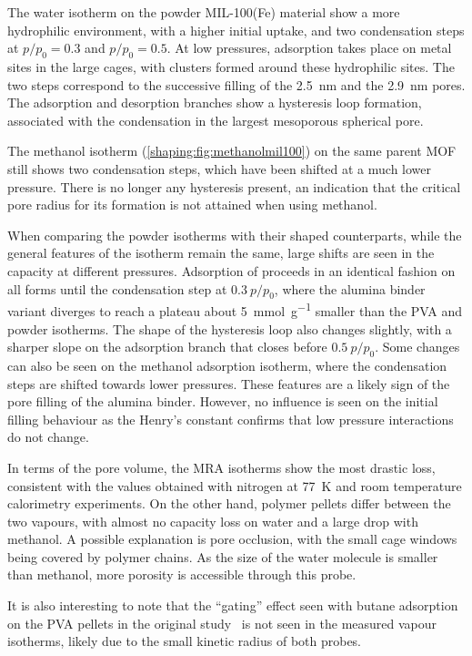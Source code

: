 The water isotherm on the powder MIL-100(Fe) material show a more 
hydrophilic environment, with a higher initial uptake, and two 
condensation steps at \(p/p_0 = 0.3\) and \(p/p_0 = 0.5\).
At low pressures, adsorption takes place on metal sites in the 
large cages, with clusters formed around these hydrophilic
sites. The two steps correspond to the successive filling of the 
\SI{2.5}{\nano\metre} and the \SI{2.9}{\nano\metre} pores. The
adsorption and desorption branches show a hysteresis loop 
formation, associated with the condensation in the largest 
mesoporous spherical pore.

The methanol isotherm (\autoref{shaping:fig:methanolmil100}) on 
the same parent \gls{MOF} still shows 
two condensation steps, which have been shifted at a much
lower pressure. There is no longer any hysteresis present,
an indication that the critical pore radius for its formation
is not attained when using methanol.

When comparing the powder isotherms with their shaped counterparts,
while the general features of the isotherm remain the same, 
large shifts are seen in the capacity at different pressures.
Adsorption of  proceeds in an identical fashion
on all forms until the condensation step at \(0.3~p/p_0\), where
the alumina binder variant diverges to reach a plateau about
\SI{5}{\milli\mol\per\gram} smaller than the \gls{PVA} and powder
isotherms. The shape of the hysteresis loop also changes slightly,
with a sharper slope on the adsorption branch that closes 
before \(0.5~p/p_0\). Some changes can also be seen on the methanol
adsorption isotherm, where the condensation steps are shifted 
towards lower pressures. These features are a likely sign of 
the pore filling of the alumina binder.
However, no influence is seen on the initial filling behaviour
as the Henry's constant confirms that low pressure 
interactions do not change. 

In terms of the pore volume, the \gls{MRA} isotherms 
show the most drastic loss, consistent with the values 
obtained with nitrogen at \SI{77}{\kelvin} and room temperature
calorimetry experiments. On the other hand, polymer pellets differ 
between the two vapours, with almost no capacity loss on water 
and a large drop with methanol. A possible explanation is 
pore occlusion, with the small cage windows being covered by 
polymer chains. As the size of the water molecule is smaller 
than methanol, more porosity is accessible through this probe.

It is also interesting to note that the
``gating'' effect seen with butane adsorption on the \gls{PVA} pellets
in the original study~\cite{chanutObservingEffectsShaping2016}
is not seen in the measured vapour isotherms, likely due to the 
small kinetic radius of both probes.

